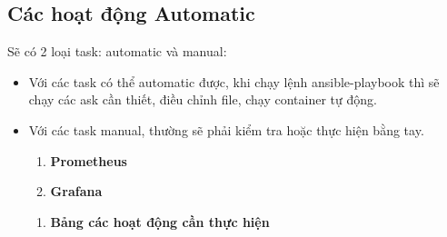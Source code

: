 \subsection{Các hoạt động Automatic}\label{cac-hoat-dong-automatic}

Sẽ có 2 loại task: automatic và manual:

\begin{itemize}
\item
  Với các task có thể automatic được, khi chạy lệnh ansible-playbook thì sẽ chạy các ask cần thiết, điều chỉnh file, chạy container tự động.
\item
  Với các task manual, thường sẽ phải kiểm tra hoặc thực hiện bằng tay.

  \begin{enumerate}
  \def\labelenumi{\arabic{enumi}.}
  \item
    \textbf{Prometheus}
  \item
    \textbf{Grafana}
  \end{enumerate}

  \begin{enumerate}
  \def\labelenumi{\arabic{enumi}.}
  \item
    \textbf{Bảng các hoạt động cần thực hiện}
  \end{enumerate}
\end{itemize}


